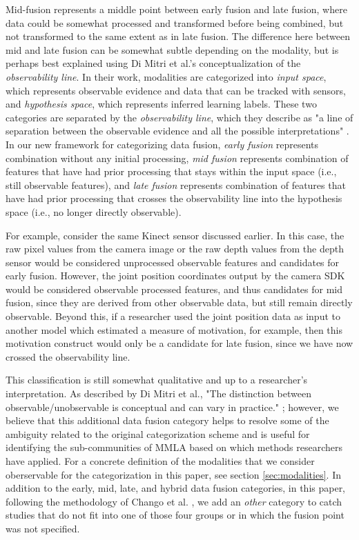 \documentclass[manuscript,screen,review]{acmart}
\begin{document}
Mid-fusion represents a middle point between early fusion and late fusion, where data could be somewhat processed and transformed before being combined, but not transformed to the same extent as in late fusion. The difference here between mid and late fusion can be somewhat subtle depending on the modality, but is perhaps best explained using Di Mitri et al.’s \cite{DiMitri2018} conceptualization of the \textit{observability line}. In their work, modalities are categorized into \textit{input space}, which represents observable evidence and data that can be tracked with sensors, and \textit{hypothesis space}, which represents inferred learning labels. These two categories are separated by the \textit{observability line}, which they describe as "a line of separation between the observable evidence and all the possible interpretations" \cite{DiMitri2018}. In our new framework for categorizing data fusion, \textit{early fusion} represents combination without any initial processing, \textit{mid fusion} represents combination of features that have had prior processing that stays within the input space (i.e., still observable features), and \textit{late fusion} represents combination of features that have had prior processing that crosses the observability line into the hypothesis space (i.e., no longer directly observable).

For example, consider the same Kinect sensor discussed earlier. In this case, the raw pixel values from the camera image or the raw depth values from the depth sensor would be considered unprocessed observable features and candidates for early fusion. However, the joint position coordinates output by the camera SDK would be considered observable processed features, and thus candidates for mid fusion, since they are derived from other observable data, but still remain directly observable. Beyond this, if a researcher used the joint position data as input to another model which estimated a measure of motivation, for example, then this motivation construct would only be a candidate for late fusion, since we have now crossed the observability line. 

This classification is still somewhat qualitative and up to a researcher's interpretation. As described by Di Mitri et al., "The distinction between observable/unobservable is conceptual and can vary in practice." \cite{DiMitri2018}; however, we believe that this additional data fusion category helps to resolve some of the ambiguity related to the original categorization scheme and is useful for identifying the sub-communities of MMLA based on which methods researchers have applied. For a concrete definition of the modalities that we consider oberservable for the categorization in this paper, see section \ref{sec:modalities}. In addition to the early, mid, late, and hybrid data fusion categories, in this paper, following the methodology of Chango et al. \cite{Chango2022}, we add an \textit{other} category to catch studies that do not fit into one of those four groups or in which the fusion point was not specified.
\end{document}
